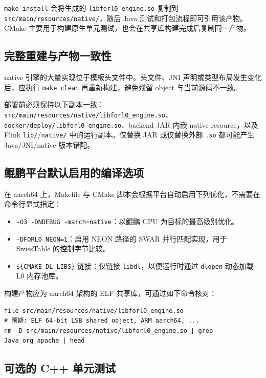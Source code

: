 \documentclass[a4paper,11pt]{article}
\begin{document}
\texttt{make install} 会将生成的 \texttt{libforl0\_engine.so} 复制到 \texttt{src/main/resources/native/}，随后 Java 测试和打包流程即可引用该产物。CMake 主要用于构建原生单元测试，也会在共享库构建完成后复制同一产物。

\subsection{完整重建与产物一致性}

native 引擎的大量实现位于模板头文件中。头文件、JNI 声明或类型布局发生变化后，应执行 \texttt{make clean} 再重新构建，避免残留 object 与当前源码不一致。

部署前必须保持以下副本一致：\nolinkurl{src/main/resources/native/libforl0_engine.so}、\nolinkurl{docker/deploy/libforl0_engine.so}、backend JAR 内嵌 native resource，以及 Flink \texttt{lib/}/\texttt{native/} 中的运行副本。仅替换 JAR 或仅替换外部 \texttt{.so} 都可能产生 Java/JNI/native 版本错配。

\subsection{鲲鹏平台默认启用的编译选项}

在 aarch64 上，Makefile 与 CMake 脚本会根据平台自动启用下列优化，不需要在命令行显式指定：

\begin{itemize}
  \item \texttt{-O3 -DNDEBUG -march=native}：以鲲鹏 CPU 为目标的最高级别优化。
  \item \texttt{-DFORL0\_NEON=1}：启用 NEON 路径的 SWAR 并行匹配实现，用于 SwissTable 的控制字节比较。
  \item \texttt{\$\{CMAKE\_DL\_LIBS\}} 链接：仅链接 \texttt{libdl}，以便运行时通过 \texttt{dlopen} 动态加载 L0 内存池库。
\end{itemize}

构建产物应为 aarch64 架构的 ELF 共享库，可通过如下命令核对：

\begin{lstlisting}[language=shellcmd]
file src/main/resources/native/libforl0_engine.so
# 预期: ELF 64-bit LSB shared object, ARM aarch64, ...
nm -D src/main/resources/native/libforl0_engine.so | grep Java_org_apache | head
\end{lstlisting}

\subsection{可选的 C++ 单元测试}
\end{document}
